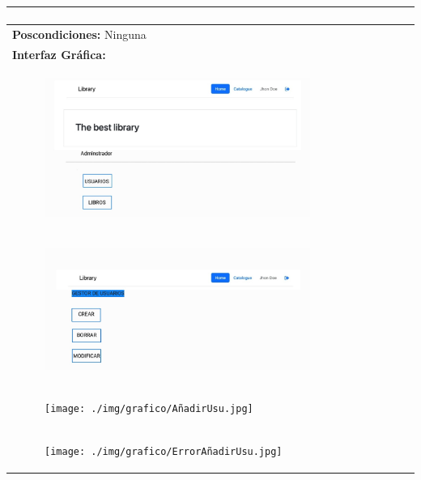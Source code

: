 \documentclass{report}
\begin{document}
\begin{center}
\begin{longtable}{|p{\linewidth}|}
\begin{enumerate}
                \end{enumerate}\\
                \hline
                \textbf{Poscondiciones:} Ninguna\\
                \hline
                \textbf{Interfaz Gráfica:}\\
                \begin{figure}[H]
                    \centering
                    \includegraphics[width=0.8\textwidth]{./img/grafico/MenuAdmin.jpg}
                \end{figure}\\
                \hline
                \begin{figure}[H]
                        \centering
                        \includegraphics[width=0.8\textwidth]{./img/grafico/MenuGestorUsu.jpg}
                    \end{figure}\\
                    \hline
                    \begin{figure}[H]
                        \centering
                        \texttt{[image: ./img/grafico/AñadirUsu.jpg]}
                    \end{figure}\\
                    \hline
                    \begin{figure}[H]
                        \centering
                        \texttt{[image: ./img/grafico/ErrorAñadirUsu.jpg]}
                    \end{figure}\\

\end{longtable}
\end{center}
\end{document}
